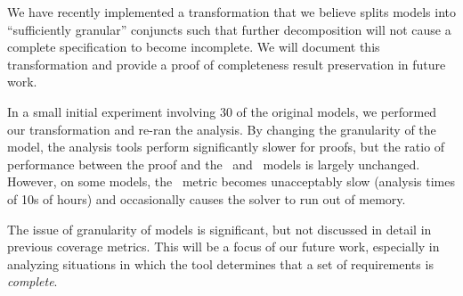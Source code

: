 %
We have recently implemented a transformation that we believe splits models into ``sufficiently granular'' conjuncts such that further decomposition will not cause a complete specification to become incomplete.  We will document this transformation and provide a proof of completeness result preservation in future work.

In a small initial experiment involving 30 of the original models, we performed our transformation and re-ran the analysis.  By changing the granularity of the model, the analysis tools perform significantly slower for proofs, but the ratio of performance between the proof and the \ucalg\ and \nondetcov\ models is largely unchanged.  However, on some models, the \nondetcov\ metric becomes unacceptably slow (analysis times of 10s of hours) and occasionally causes the solver to run out of memory.

The issue of granularity of models is significant, but not discussed in detail in previous coverage metrics.  This will be a focus of our future work, especially in analyzing situations in which the tool determines that a set of requirements is {\em complete}.

